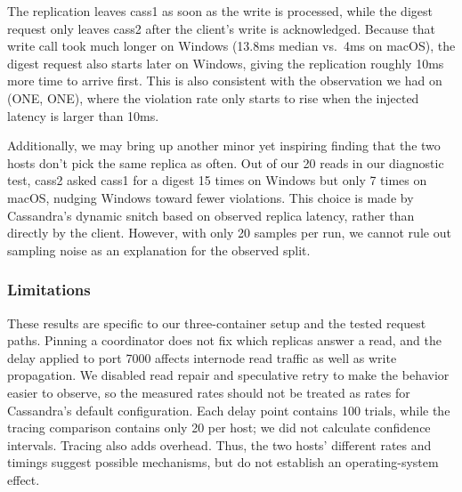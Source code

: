 The replication leaves cass1 as soon as the write is processed, while the digest request only leaves cass2 after the client's write is acknowledged. Because that write call took much longer on Windows (13.8ms median vs.~4ms on macOS), the digest request also starts later on Windows, giving the replication roughly 10ms more time to arrive first. This is also consistent with the observation we had on (ONE, ONE), where the violation rate only starts to rise when the injected latency is larger than 10ms.

Additionally, we may bring up another minor yet inspiring finding that the two hosts don't pick the same replica as often. Out of our 20 reads in our diagnostic test, cass2 asked cass1 for a digest 15 times on Windows but only 7 times on macOS, nudging Windows toward fewer violations. This choice is made by Cassandra's dynamic snitch based on observed replica latency, rather than directly by the client. However, with only 20 samples per run, we cannot rule out sampling noise as an explanation for the observed split.

\subsubsection{Limitations}\label{ryw:limitations}

These results are specific to our three-container setup and the tested request paths. Pinning a coordinator does not fix which replicas answer a read, and the delay applied to port 7000 affects internode read traffic as well as write propagation. We disabled read repair and speculative retry to make the behavior easier to observe, so the measured rates should not be treated as rates for Cassandra's default configuration. Each delay point contains 100 trials, while the tracing comparison contains only 20 per host; we did not calculate confidence intervals. Tracing also adds overhead. Thus, the two hosts' different rates and timings suggest possible mechanisms, but do not establish an operating-system effect.